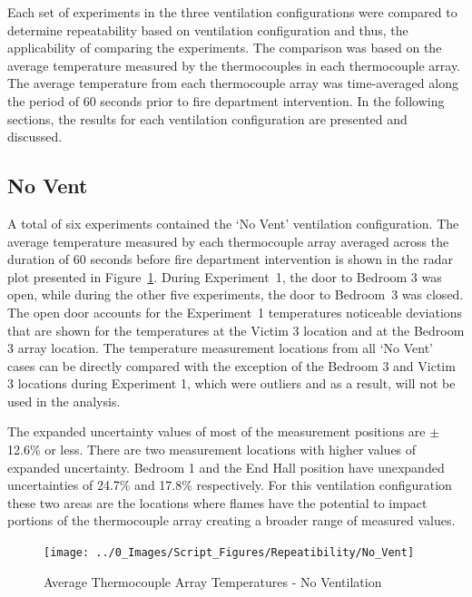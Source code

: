 \documentclass[12pt,oneside]{book}
\begin{document}
Each set of experiments in the three ventilation configurations were compared to determine repeatability based on ventilation configuration and thus, the applicability of comparing the experiments. The comparison was based on the average temperature measured by the thermocouples in each thermocouple array. The average temperature from each thermocouple array was time-averaged along the period of 60 seconds prior to fire department intervention. In the following sections, the results for each ventilation configuration are presented and discussed. 

\subsection{No Vent}
A total of six experiments contained the `No Vent' ventilation configuration. The average temperature measured by each thermocouple array averaged across the duration of 60 seconds before fire department intervention is shown in the radar plot presented in Figure~\ref{fig:repeat_No_Vent}. During Experiment~1, the door to Bedroom 3 was open, while during the other five experiments, the door to Bedroom~3 was closed. The open door accounts for the Experiment~1 temperatures noticeable deviations that are shown for the temperatures at the Victim 3 location and at the Bedroom 3 array location. The temperature measurement locations from all `No Vent' cases can be directly compared with the exception of the Bedroom 3 and Victim 3 locations during Experiment 1, which were outliers and as a result, will not be used in the analysis. 

The expanded uncertainty values of most of the measurement positions are $\pm$ 12.6\% or less.  There are two measurement locations with higher values of expanded uncertainty. Bedroom 1 and the End Hall position have unexpanded uncertainties of 24.7\% and 17.8\% respectively.  For this ventilation configuration these two areas are the locations where flames have the potential to impact portions of the thermocouple array creating a broader range of measured values.   

\begin{figure}[H]
\centering
\texttt{[image: ../0\_Images/Script\_Figures/Repeatibility/No\_Vent]}
\caption{Average Thermocouple Array Temperatures - No Ventilation}
\label{fig:repeat_No_Vent}
\end{figure}
\end{document}
